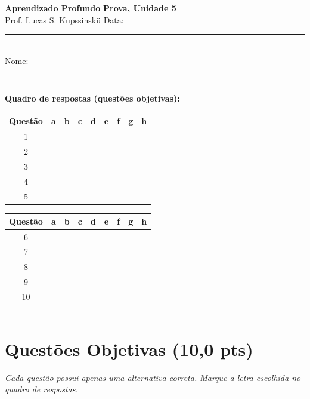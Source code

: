 \documentclass[11pt,a4paper]{article}
\begin{document}
{\Large\bfseries Aprendizado Profundo} \hfill \textbf{Prova, Unidade 5}\\
Prof. Lucas S. Kupssinskü \hfill Data: \rule{3cm}{0.4pt}\\[0.4em]
Nome: \rule{12cm}{0.4pt}

\rule{\linewidth}{0.8pt}

\textbf{Quadro de respostas (questões objetivas):}\\[0.3em]
\begin{center}
\begin{tabular}{|c|c|c|c|c|c|c|c|c|}
\hline
\textbf{Questão} & \textbf{a} & \textbf{b} & \textbf{c} & \textbf{d} & \textbf{e} & \textbf{f} & \textbf{g} & \textbf{h} \\\hline
1 & & & & & & & & \\\hline
2 & & & & & & & & \\\hline
3 & & & & & & & & \\\hline
4 & & & & & & & & \\\hline
5 & & & & & & & & \\\hline
\end{tabular}
\qquad
\begin{tabular}{|c|c|c|c|c|c|c|c|c|}
\hline
\textbf{Questão} & \textbf{a} & \textbf{b} & \textbf{c} & \textbf{d} & \textbf{e} & \textbf{f} & \textbf{g} & \textbf{h} \\\hline
6 & & & & & & & & \\\hline
7 & & & & & & & & \\\hline
8 & & & & & & & & \\\hline
9 & & & & & & & & \\\hline
10 & & & & & & & & \\\hline
\end{tabular}
\end{center}

\rule{\linewidth}{0.4pt}

\section*{Questões Objetivas (10{,}0 pts)}
\textit{Cada questão possui apenas uma alternativa correta. Marque a letra escolhida no quadro de respostas.}
\end{document}
